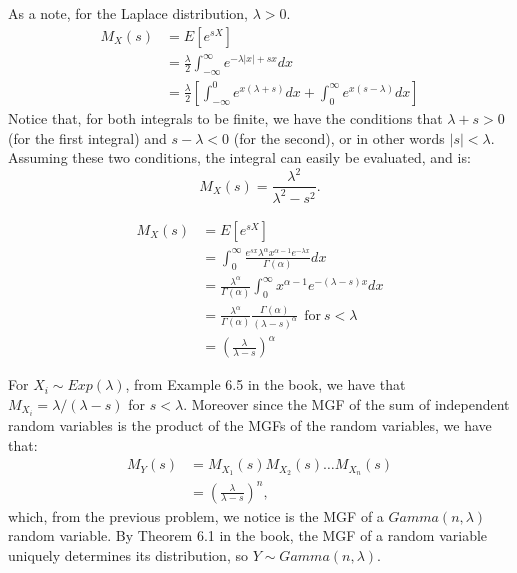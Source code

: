\begin{problem}{9} As a note, for the Laplace distribution, $\lambda>0$.
\begin{align*}
M_X(s) &= E[e^{sX}] \\
& = \frac{\lambda}{2}\int_{-\infty}^\infty e^{-\lambda |x|+sx}dx \\ 
&=\frac{\lambda}{2}\left [\int_{-\infty}^0e^{x(\lambda+s)}dx+ \int_0^{\infty}e^{x(s-\lambda)}dx \right]
\end{align*}
Notice that, for both integrals to be finite, we have the conditions that $\lambda +s>0$ (for the first integral) and $s- \lambda <0$ (for the second), or in other words $|s|<\lambda$.  Assuming these two conditions, the integral can easily be evaluated, and is:
\begin{equation*}
M_X(s) = \frac{\lambda^2}{\lambda^2-s^2}.
\end{equation*}

\end{problem}

\begin{problem}{10}
\begin{align*}
M_X(s) &= E[e^{sX}] \\
& = \int_0^\infty \frac{e^{sx}\lambda^\alpha x^{\alpha-1}e^{-\lambda x}}{\Gamma(\alpha)}dx \\
& = \frac{\lambda^\alpha}{\Gamma(\alpha)}\int_0^\infty x^{\alpha-1} e^{-(\lambda-s)x}dx \\
&= \frac{\lambda^\alpha}{\Gamma(\alpha)}\frac{\Gamma(\alpha)}{(\lambda-s)^\alpha}~~\mathrm{for~} s<\lambda \\
& = \left( \frac{\lambda}{\lambda-s}\right)^\alpha
\end{align*}

\end{problem}


\begin{problem}{11} For $X_i \sim Exp(\lambda)$, from Example 6.5 in the book, we have that $M_{X_i} = \lambda/(\lambda-s)$ for $s<\lambda$.  Moreover since the MGF of the sum of independent random variables is the product of the MGFs of the random variables, we have that:
\begin{align*}
M_Y(s) &= M_{X_1}(s)M_{X_2}(s) \ldots M_{X_n}(s) \\
&=\left(\frac{\lambda}{\lambda-s}\right)^n,
\end{align*}
which, from the previous problem, we notice is the MGF of a $Gamma(n, \lambda)$ random variable.  By Theorem 6.1 in the book, the MGF of a random variable uniquely determines its distribution,
so $Y\sim Gamma(n, \lambda)$.
\end{problem}

